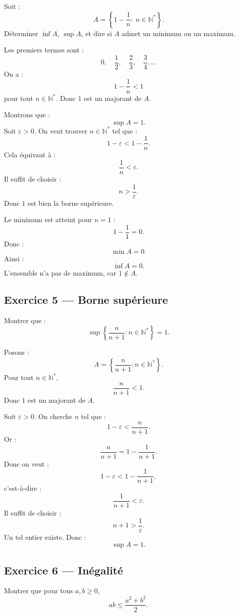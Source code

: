 \documentclass[11pt,a4paper]{article}
\newcommand{\N}{\mathbb N}
\begin{document}
\begin{exercicebox}
Soit :
\[
A=\left\{1-\frac1n:\ n\in\N^*\right\}.
\]
Déterminer \(\inf A\), \(\sup A\), et dire si \(A\) admet un minimum ou un maximum.
\end{exercicebox}

\begin{correctionbox}
Les premiers termes sont :
\[
0,\quad \frac12,\quad \frac23,\quad \frac34,\dots
\]
On a :
\[
1-\frac1n<1
\]
pour tout \(n\in\N^*\).  
Donc \(1\) est un majorant de \(A\).

Montrons que :
\[
\sup A=1.
\]
Soit \(\varepsilon>0\).  
On veut trouver \(n\in\N^*\) tel que :
\[
1-\varepsilon<1-\frac1n.
\]
Cela équivaut à :
\[
\frac1n<\varepsilon.
\]
Il suffit de choisir :
\[
n>\frac1\varepsilon.
\]
Donc \(1\) est bien la borne supérieure.

Le minimum est atteint pour \(n=1\) :
\[
1-\frac11=0.
\]
Donc :
\[
\min A=0.
\]
Ainsi :
\[
\inf A=0.
\]
L'ensemble n'a pas de maximum, car \(1\notin A\).
\end{correctionbox}

\subsection*{Exercice 5 — Borne supérieure}

\begin{exercicebox}
Montrer que :
\[
\sup\left\{\frac{n}{n+1}: n\in\N^*\right\}=1.
\]
\end{exercicebox}

\begin{correctionbox}
Posons :
\[
A=\left\{\frac{n}{n+1}:n\in\N^*\right\}.
\]
Pour tout \(n\in\N^*\),
\[
\frac{n}{n+1}<1.
\]
Donc \(1\) est un majorant de \(A\).

Soit \(\varepsilon>0\).  
On cherche \(n\) tel que :
\[
1-\varepsilon<\frac{n}{n+1}.
\]
Or :
\[
\frac{n}{n+1}=1-\frac1{n+1}.
\]
Donc on veut :
\[
1-\varepsilon<1-\frac1{n+1},
\]
c'est-à-dire :
\[
\frac1{n+1}<\varepsilon.
\]
Il suffit de choisir :
\[
n+1>\frac1\varepsilon.
\]
Un tel entier existe.  
Donc :
\[
\sup A=1.
\]
\end{correctionbox}

\subsection*{Exercice 6 — Inégalité}

\begin{exercicebox}
Montrer que pour tous \(a,b\geq0\),
\[
ab\leq \frac{a^2+b^2}{2}.
\]
\end{exercicebox}
\end{document}
